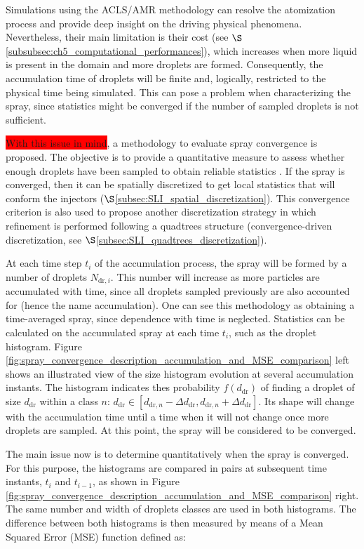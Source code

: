 Simulations using the ACLS/AMR methodology can resolve the atomization process and provide deep insight on the driving physical phenomena. Nevertheless, their main limitation is their cost (see $\S$\ref{subsubsec:ch5_computational_performances}), which increases when more liquid is present in the domain and more droplets are formed. Consequently, the accumulation time of droplets will be finite and, logically, restricted to the physical time being simulated. This can pose a problem when characterizing the spray, since statistics might be converged if the number of sampled droplets is not sufficient.

\colorbox{red}{With this issue in mind}, a methodology to evaluate spray convergence is proposed. The objective is to provide a quantitative measure to assess whether enough droplets have been sampled to obtain reliable statistics . If the spray is converged, then it can be spatially discretized to get local statistics that will conform the injectors ($\S$\ref{subsec:SLI_spatial_discretization}). This convergence criterion is also used to propose another discretization strategy in which refinement is performed following a quadtrees structure (convergence-driven discretization, see $\S$\ref{subsec:SLI_quadtrees_discretization}).

At each time step $t_i$ of the accumulation process, the spray will be formed by a number of droplets $N_{\mathrm{dr},i}$. This number will increase as more particles are accumulated with time, since all droplets sampled previously are also accounted for (hence the name accumulation). One can see this methodology as obtaining a time-averaged spray, since dependence with time is neglected. Statistics can be calculated on the accumulated spray at each time $t_i$, such as the droplet histogram. Figure \ref{fig:spray_convergence_description_accumulation_and_MSE_comparison} left shows an illustrated view of the size histogram evolution at several accumulation instants. The histogram indicates thes probability $f \left( d_\mathrm{dr} \right)$ of finding a droplet of size $d_\mathrm{dr}$ within a class $n$: $d_\mathrm{dr} \in \left[ d_{\mathrm{dr},n}-\Delta d_\mathrm{dr}, d_{\mathrm{dr},n}+\Delta d_\mathrm{dr} \right]$. Its shape will change with the accumulation time until a time when it will not change once more droplets are sampled. At this point, the spray will be considered to be converged. 

The main issue now is to determine quantitatively when the spray is converged. For this purpose, the histograms are compared in pairs at subsequent time instants, $t_i$ and $t_{i-1}$, as shown in Figure \ref{fig:spray_convergence_description_accumulation_and_MSE_comparison} right. The same number and width of droplets classes are used in both histograms. The difference between both histograms is then measured by means of a Mean Squared Error (MSE) function defined as:

